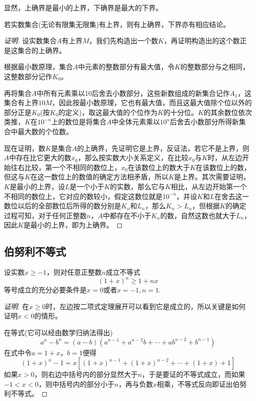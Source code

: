 显然，上确界是最小的上界，下确界是最大的下界。

\begin{theorem}[确界定理]
若实数集合(无论有限集无限集)有上界，则有上确界，下界亦有相应结论。
\end{theorem}

\begin{proof}[证明]
设实数集合$A$有上界$M$，我们先构造出一个数$K$，再证明构造出的这个数正是这集合的上确界。

根据最小数原理，集合$A$中元素的整数部分有最大值，令$K$的整数部分与之相同，这整数部分记作$K_0$。

再将集合$A$中所有元素乘以10后舍去小数部分，这些新数组成的新集合记作$A_1$，这集合有上界$10M$，因此按最小数原理，它也有最大值，而且这最大值除个位以外的部分正是$K_0$(按$K_0$的定义)，取这最大值的个位作为$K$的十分位。$K$的其余数位依次类推，$K$在$10^{-n}$上的数位是将集合$A$中全体元素乘以$10^n$后舍去小数部分所得新集合中最大数的个位数。

现在证明，数$K$是集合$A$的上确界，先证明它是上界，反证法，若它不是上界，则$A$中存在比它更大的数$x_0$，那么按实数大小关系定义，在比较$x_0$与$K$时，从左边开始往右比较，第一个不相同的数位上，$x_0$在该数位上的数大于$K$在该数位上的数，但这与$K$在这一数位上的数值的确定方法相矛盾，所以$K$是上界。其次需要证明，$K$是最小的上界，设$L$是一个小于$K$的实数，那么它与$K$相比，从左边开始第一个不相同的数位上，它对应的数较小，假定这数位就是$10^{-n}$，并设$K$和$L$在舍去这一数位以后的全部数位后所得的数分别是$K_n$和$L_n$，那么$K_n>L_n$，但根据$K$的确定过程可知，对于任何正整数$n$，$A$中都存在不小于$K_n$的数，自然这数也就大于$L_n$，因此$K$是最小的上界，即为上确界。
\end{proof}

\subsection{伯努利不等式}
\label{sec:bernoulli-inequality}

\begin{theorem}
  \label{theorem:bernoulli-inequality}
  设实数$x \geqslant -1$，则对任意正整数$n$成立不等式
  \begin{equation}
    \label{eq:bernoulli-inequality}
   (1+x)^n \geqslant 1+nx 
 \end{equation}
 等号成立的充分必要条件是$x=0$或者$x=-1,n=1$.
\end{theorem}

\begin{proof}[证明]
  在$x \geqslant 0$时，左边按二项式定理展开可以看到它是成立的，所以关键是如何证明$x<0$的情形。

  在等式(它可以经由数学归纳法得出)
  \[ a^n-b^n = (a-b)(a^{n-1}+a^{n-2}b+\cdots+ab^{n-2}+b^{n-1}) \]
  在式中令$a=1+x$，$b=1$便得
  \[ (1+x)^n-1=x \left[ (1+x)^{n-1}+(1+x)^{n-2}+\cdots+(1+x)+1 \right] \]
  如果$x>0$，则右边中括号内的部分显然大于$n$，于是要证的不等式成立，而如果$-1<x<0$，则中括号内的部分小于$n$，再与负数$x$相乘，不等式反向即证出伯努利不等式。
\end{proof}

